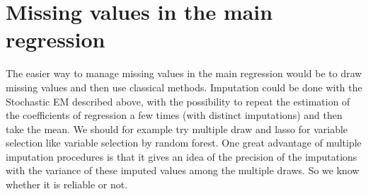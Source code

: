 \documentclass[12pt,a4paper]{report}
\begin{document}
%			
%			
			
	\section{Missing values in the main regression}
		The easier way to manage missing values in the main regression would be to draw missing values and then use classical methods. Imputation could be done with the Stochastic EM described above, with the possibility to repeat the estimation of the coefficients of regression a few times (with distinct imputations) and then take the mean. We should for example try multiple draw and {\sc lasso} for variable selection like variable selection by random forest. One great advantage of multiple imputation procedures is that it gives an idea of the precision of the imputations with the variance of these imputed values among the multiple draws. So we know whether it is reliable or not. \\
		
		
				
\end{document}
